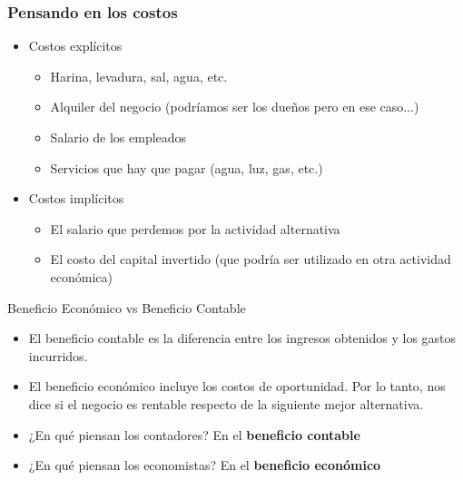 \documentclass{beamer}
\begin{document}
\begin{frame}
\frametitle{Pensando en los costos}
\begin{itemize}
    \item Costos explícitos \vspace{2mm} 
    \begin{itemize}
        \item Harina, levadura, sal, agua, etc.
        \item Alquiler del negocio (podríamos ser los dueños pero en ese caso...)
        \item Salario de los empleados 
        \item Servicios que hay que pagar (agua, luz, gas, etc.) \vspace{2mm} 
    \end{itemize}
    \item Costos implícitos \vspace{2mm} 
    \begin{itemize}
        \item El salario que perdemos por la actividad alternativa
        \item El costo del capital invertido (que podría ser utilizado en otra actividad económica)
    \end{itemize}
\end{itemize}
\end{frame}

\begin{frame}{Beneficio Económico vs Beneficio Contable}
    \begin{itemize}
        \item El beneficio contable es la diferencia entre los ingresos obtenidos y los gastos incurridos. \vspace{2mm} 
        \item El beneficio económico incluye los costos de oportunidad. Por lo tanto, nos dice si el negocio es rentable respecto de la siguiente mejor alternativa. \vspace{2mm} 
        \item ¿En qué piensan los contadores? En el \textbf{beneficio contable} \vspace{2mm} 
        \item ¿En qué piensan los economistas? En el \textbf{beneficio económico} \vspace{2mm} 
    \end{itemize}
\end{frame}
\end{document}
